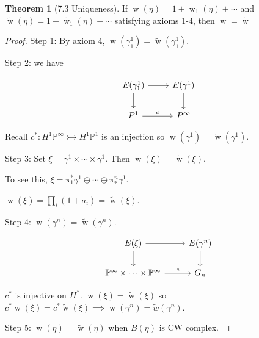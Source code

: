 \documentclass{article}
\theoremstyle{definition}
\newtheorem{theorem}{Theorem}
\begin{document}
    \begin{theorem}
        [7.3 Uniqueness]

        If \(\operatorname{w} (\eta) = 1 + \operatorname{w}_1(\eta) + \cdots\) and \(\widetilde{\operatorname{w}}(\eta) = 1 + \widetilde{\operatorname{w}}_1(\eta) + \cdots \) satisfying axioms 1-4, then \(\operatorname{w} = \widetilde{\operatorname{w}}\) 
    \end{theorem}

    \begin{proof}
        Step 1: By axiom 4, \(\operatorname{w} (\gamma^1_1) = \widetilde{\operatorname{w}} (\gamma^1_1)\).

        Step 2: we have

        \[
            \begin{tikzcd}
                E(\gamma^1_1) \ar[r] \ar[d] & E(\gamma^1) \ar[d] \\ P^1 \ar[r,"c"] & P^{\infty}
            \end{tikzcd}
        \]

        Recall \(c^{\ast} : H^1 \mathbb{P}^{\infty}  \rightarrowtail H^1 \mathbb{P}^1\) is an injection so \(\operatorname{w}(\gamma^1) = \widetilde{\operatorname{w}}(\gamma^1)\).

        Step 3: Set \(\xi = \gamma^1 \times \cdots \times \gamma^1\). Then \(\operatorname{w} (\xi) = \widetilde{\operatorname{w}}(\xi)\).

        To see this, \(\xi = \pi_1 ^{\ast} \gamma^1 \oplus \cdots \oplus \pi^n_{\ast} \gamma^1\).

        \(\operatorname{w} (\xi) = \prod_i (1 + a_i) = \widetilde{\operatorname{w} } (\xi)\).
        
        Step 4: \(\operatorname{w} (\gamma^n) = \widetilde{\operatorname{w}}(\gamma^n) \).
        
        \[
            \begin{tikzcd}
                E(\xi) \ar[r] \ar[d] & E(\gamma^n) \ar[d] \\ \mathbb{P}^{\infty} \times \cdots \times \mathbb{P} ^{\infty} \ar[r,"c"] & G_n
            \end{tikzcd}
        \]

        \(c^{\ast}\) is injective on \(H^{\ast}\). \(\operatorname{w}(\xi) = \widetilde{\operatorname{w}}(\xi)\) so \(c^{\ast} \operatorname{w} (\xi) = c^{\ast} \widetilde{\operatorname{w}} (\xi) \implies \operatorname{w} (\gamma^n) = \widetilde{w}(\gamma^n)\).

        Step 5: \(\operatorname{w}(\eta) = \widetilde{\operatorname{w}} (\eta)\) when \(B(\eta)\) is CW complex.


\end{proof}
\end{document}
